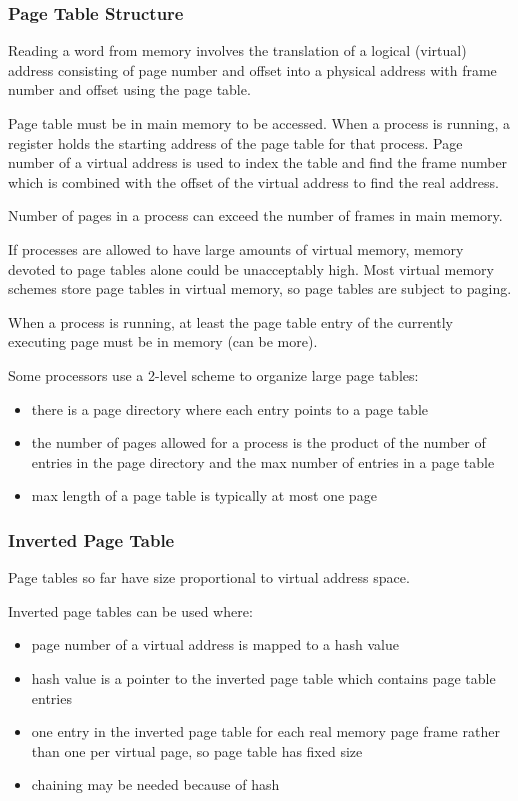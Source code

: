 \documentclass[11pt]{article}
\begin{document}
\subsubsection{Page Table Structure}
\label{sec:orgc08d808}
Reading a word from memory involves the translation of a logical (virtual) address
consisting of page number and offset into a physical address with frame number
and offset using the page table.

Page table must be in main memory to be accessed.
When a process is running, a register holds the starting address of the page table
for that process.
Page number of a virtual address is used to index the table and find the frame
number which is combined with the offset of the virtual address to find the real address.

Number of pages in a process can exceed the number of frames in main memory.

If processes are allowed to have large amounts of virtual memory, memory devoted to
page tables alone could be unacceptably high.
Most virtual memory schemes store page tables in virtual memory, so page tables
are subject to paging.

When a process is running, at least the page table entry of the currently executing
page must be in memory (can be more).

Some processors use a 2-level scheme to organize large page tables:
\begin{itemize}
\item there is a page directory where each entry points to a page table
\item the number of pages allowed for a process is the product of the number of entries
in the page directory and the max number of entries in a page table
\item max length of a page table is typically at most one page
\end{itemize}
\subsubsection{Inverted Page Table}
\label{sec:orga176d91}
Page tables so far have size proportional to virtual address space.

Inverted page tables can be used where:
\begin{itemize}
\item page number of a virtual address is mapped to a hash value
\item hash value is a pointer to the inverted page table which contains page table entries
\item one entry in the inverted page table for each real memory page frame rather than
one per virtual page, so page table has fixed size
\item chaining may be needed because of hash
\end{itemize}
\end{document}
